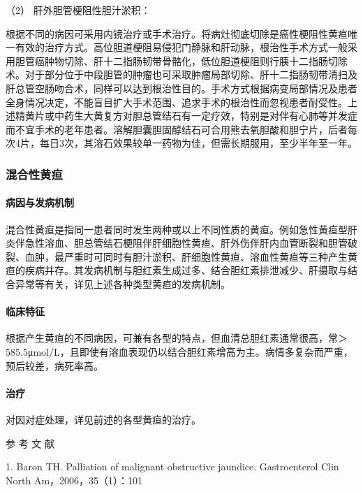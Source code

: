\hypertarget{text00039.htmlux5cux23CHP1-16-4-4-3-2}{}
（2） 肝外胆管梗阻性胆汁淤积：

根据不同的病因可采用内镜治疗或手术治疗。将病灶彻底切除是癌性梗阻性黄疸唯一有效的治疗方式。高位胆道梗阻易侵犯门静脉和肝动脉，根治性手术方式一般采用胆管癌肿物切除、肝十二指肠韧带骨骼化，低位胆道梗阻则行胰十二指肠切除术。对于部分位于中段胆管的肿瘤也可采取肿瘤局部切除、肝十二指肠韧带清扫及肝总管空肠吻合术，同样可以达到根治性目的。手术方式根据病变局部情况及患者全身情况决定，不能盲目扩大手术范围、追求手术的根治性而忽视患者耐受性。上述精黄片或中药生大黄复方对胆总管结石有一定疗效，特别是对伴有心肺等并发症而不宜手术的老年患者。溶解胆囊胆固醇结石可合用熊去氧胆酸和胆宁片，后者每次4片，每日3次，其溶石效果较单一药物为佳，但需长期服用，至少半年至一年。

\subsubsection{混合性黄疸}

\paragraph{病因与发病机制}

混合性黄疸是指同一患者同时发生两种或以上不同性质的黄疸。例如急性黄疸型肝炎伴急性溶血、胆总管结石梗阻伴肝细胞性黄疸、肝外伤伴肝内血管断裂和胆管破裂、血肿，最严重时可同时有胆汁淤积、肝细胞性黄疸、溶血性黄疸等三种产生黄疸的疾病并存。其发病机制与胆红素生成过多、结合胆红素排泄减少、肝摄取与结合异常等有关，详见上述各种类型黄疸的发病机制。

\paragraph{临床特征}

根据产生黄疸的不同病因，可兼有各型的特点，但血清总胆红素通常很高，常＞
585.5μmol/L，且即使有溶血表现仍以结合胆红素增高为主。病情多复杂而严重，预后较差，病死率高。

\paragraph{治疗}

对因对症处理，详见前述的各型黄疸的治疗。

\protect\hypertarget{text00040.html}{}{}

\hypertarget{text00040.htmlux5cux23CHP1-16-5}{}
参 考 文 献

1. Baron TH. Palliation of malignant obstructive jaundice. Gastroenterol
Clin North Am，2006，35（1）：101


